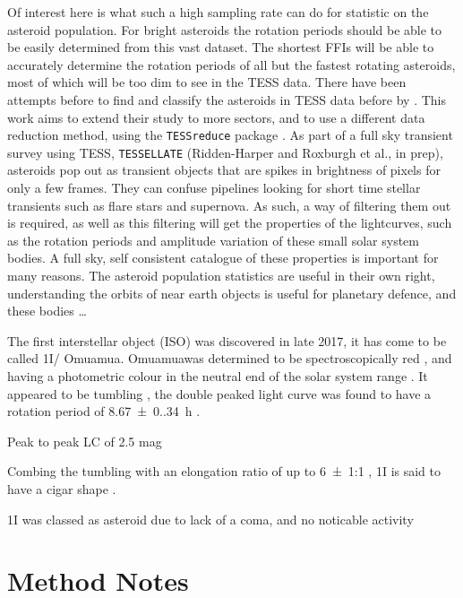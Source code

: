 \documentclass[12pt]{article}
\DeclareRobustCommand{\okina}{%
  \raisebox{\dimexpr\fontcharht\font`A-\height}{%
    \scalebox{0.8}{`}%
  }%
}
\newcommand{\omuamua}{\okina Omuamua}
\begin{document}
Of interest here is what such a high sampling rate can do for statistic on the asteroid population. 
For bright asteroids the rotation periods should be able to be easily determined from this vast dataset. 
The shortest FFIs will be able to accurately determine the rotation periods of all but the fastest rotating asteroids, most of which will be too dim to see in the TESS data. 
There have been attempts before to find and classify the asteroids in TESS data before by \citet{Pal2018, Pal2020}. This work aims to extend their study to more sectors, and to use a different data reduction method, using the \texttt{TESSreduce} package \citep{Ridden-Harper2021}. 
As part of a full sky transient survey using TESS, \texttt{TESSELLATE} (Ridden-Harper and Roxburgh et al., in prep), asteroids pop out as transient objects that are spikes in brightness of pixels for only a few frames. 
They can confuse pipelines looking for short time stellar transients such as flare stars and supernova. 
As such, a way of filtering them out is required, as well as this filtering will get the properties of the lightcurves, such as the rotation periods and amplitude variation of these small solar system bodies.
A full sky, self consistent catalogue of these properties is important for many reasons. 
The asteroid population statistics are useful in their own right, understanding the orbits of near earth objects is useful for planetary defence, and these bodies \dots      


The first interstellar object (ISO) was discovered in late 2017, it has come to be called 1I/\omuamua \citep[see][for a review]{Bannister2019}.
\omuamua was determined to be spectroscopically red \citep{Fitzsimmons2017, Meech2017}, and having a photometric colour in the neutral end of the solar system range \citep{Bannister2017}. 
It appeared to be tumbling \citep[e.g.][]{Drahus2018,Fraser2018}, the double peaked light curve was found to have a rotation period of \qty{8.67(0.34)}{\hour} \citep{Belton2018}.

Peak to peak LC of 2.5 mag %

Combing the tumbling with an elongation ratio of up to \qty{6(1)}{}:1 \citep{McNeill2018}, 1I is said to have a cigar shape \citep{Belton2018}.  


1I was classed as asteroid due to lack of a coma, and no noticable activity %


\section{Method Notes}
\end{document}
